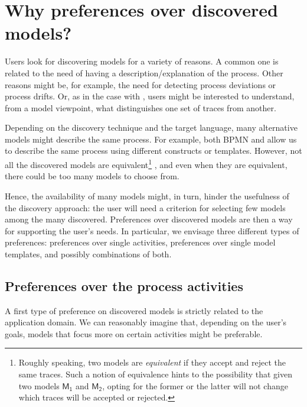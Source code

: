 
\section{Why preferences over discovered models?}
\label{sec:example}


Users look for discovering models for a variety of reasons. A common one is related to the need of having a description/explanation of the process. Other reasons might be, for example, the need for detecting process deviations or process drifts. Or, as in the case with \nd, users might be interested to understand, from a model viewpoint, what distinguishes one set of traces from another. 

Depending on the discovery technique and the target language, many alternative models might describe the same process. For example, both BPMN and \declare allow us to describe the same process using different constructs or templates. However, not all the discovered models are equivalent\footnote{Roughly speaking, two models are \emph{equivalent} if they accept and reject the same traces. Such a notion of equivalence hints to the possibility that given two models $\mathsf{M_1}$ and $\mathsf{M_2}$, opting for the former or the latter will not change which traces will be accepted or rejected.}
, and even when they are equivalent, there could be too many models to choose from.

Hence, the availability of many models might, in turn, hinder the usefulness of the discovery approach: the user will need a criterion for selecting few models among the many discovered.
%
Preferences over discovered models are then a way for supporting the user's needs. In particular, we envisage three different types of preferences: preferences over single activities, preferences over single model templates, and possibly combinations of both.



\subsection{Preferences over the process activities}
\label{subsec:prefOverActivities}

A first type of preference on discovered models is strictly related to the application domain. We can reasonably imagine that, depending on the user's goals, models that focus more on certain activities might be preferable.

